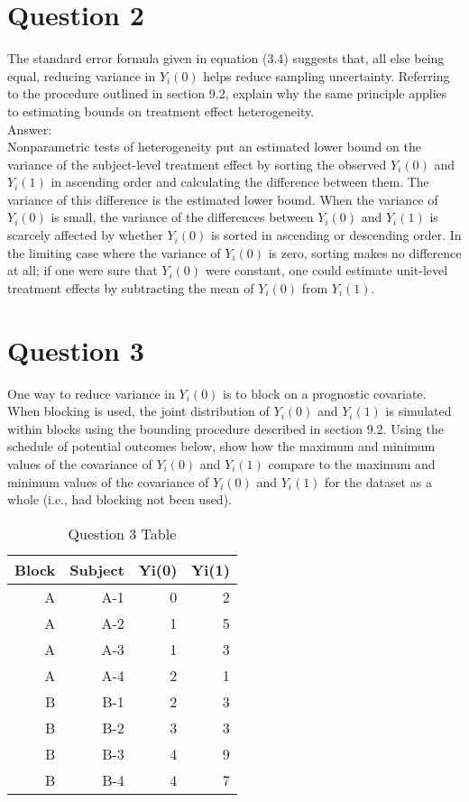 \documentclass[11pt,notitlepage]{article}\usepackage[]{graphicx}\usepackage[]{color}
\begin{document}
\section*{Question 2}
The standard error formula given in equation (3.4) suggests that, all else being equal, reducing variance in $Y_i(0)$ helps reduce sampling uncertainty. Referring to the procedure outlined in section 9.2, explain why the same principle applies to estimating bounds on treatment effect heterogeneity.\\
Answer:\\
Nonparametric tests of heterogeneity put an estimated lower bound on the variance of the subject-level treatment effect by sorting the observed $Y_i(0)$ and $Y_i(1)$ in ascending order and calculating the difference between them. The variance of this difference is the estimated lower bound.  When the variance of $Y_i(0)$ is small, the variance of the differences between $Y_i(0)$ and $Y_i(1)$ is scarcely affected by whether $Y_i(0)$ is sorted in ascending or descending order. In the limiting case where the variance of $Y_i(0)$ is zero, sorting makes no difference at all; if one were sure that $Y_i(0)$ were constant, one could estimate unit-level treatment effects by subtracting the mean of $Y_i(0)$ from $Y_i(1)$.

\section*{Question 3}
One way to reduce variance in $Y_i(0)$ is to block on a prognostic covariate. When blocking is used, the joint distribution of $Y_i(0)$ and $Y_i(1)$ is simulated within blocks using the bounding procedure described in section 9.2. Using the schedule of potential outcomes below, show how the maximum and minimum values of the covariance of $Y_i(0)$ and $Y_i(1)$ compare to the maximum and minimum values of the covariance of $Y_i(0)$ and $Y_i(1)$ for the dataset as a whole (i.e., had blocking not been used).

\begin{table}[H]
  \centering
  \caption{Question 3 Table}
    \begin{tabular}{rrrr}
    \toprule
    Block  & Subject  & Yi(0)  & Yi(1)  \\
    \midrule
    A     & A-1   & 0     & 2 \\
    A     & A-2   & 1     & 5 \\
    A     & A-3   & 1     & 3 \\
    A     & A-4   & 2     & 1 \\
    B     & B-1   & 2     & 3 \\
    B     & B-2   & 3     & 3 \\
    B     & B-3   & 4     & 9 \\
    B     & B-4   & 4     & 7 \\
    \bottomrule
    \end{tabular}%
  \label{tab:addlabel}%
\end{table}%
\end{document}
